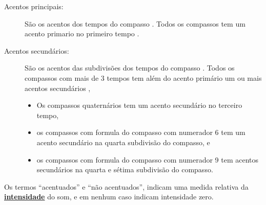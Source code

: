 \begin{description}
\item[Acentos principais:] \label{def:acentoprincipal} 
São os acentos dos tempos do compasso  \cite[pp. 142]{medteoria}.
Todos os compassos tem um acento primario no primeiro tempo \cite[pp. 24]{crowther2003usted}.
\item[Acentos secundários:] \label{def:acentosecundario} 
São os acentos das subdivisões dos tempos do compasso \cite[pp. 142]{medteoria}.
Todos os compassos com mais de 3 tempos tem além do acento primário um ou mais acentos secundários \cite[pp. 25]{crowther2003usted},
\begin{itemize}
\item Os compassos quaternários tem um acento secundário no terceiro tempo,
\item os compassos com formula do compasso com numerador 6  tem um acento secundário na quarta subdivisão do compasso, e
\item os compassos com formula do compasso com numerador 9  tem    acentos secundários na quarta e sétima subdivisão do compasso.
\end{itemize} 
\end{description}

\begin{remark}
Os termos ``acentuados'' e ``não acentuados'', 
indicam uma medida relativa da \hyperref[sec:pos:Intensidade]{\textbf{intensidade}} do som, 
e em nenhum caso indicam intensidade zero. 
\end{remark}

